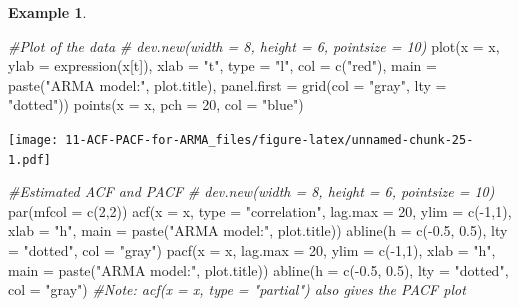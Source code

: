 \documentclass[
]{book}
\newenvironment{Shaded}{\begin{snugshade}}{\end{snugshade}}
\newcommand{\AttributeTok}[1]{\textcolor[rgb]{0.77,0.63,0.00}{#1}}
\newcommand{\CommentTok}[1]{\textcolor[rgb]{0.56,0.35,0.01}{\textit{#1}}}
\newcommand{\DecValTok}[1]{\textcolor[rgb]{0.00,0.00,0.81}{#1}}
\newcommand{\FloatTok}[1]{\textcolor[rgb]{0.00,0.00,0.81}{#1}}
\newcommand{\FunctionTok}[1]{\textcolor[rgb]{0.00,0.00,0.00}{#1}}
\newcommand{\NormalTok}[1]{#1}
\newcommand{\SpecialCharTok}[1]{\textcolor[rgb]{0.00,0.00,0.00}{#1}}
\newcommand{\StringTok}[1]{\textcolor[rgb]{0.31,0.60,0.02}{#1}}
\theoremstyle{definition}
\theoremstyle{definition}
\newtheorem{example}{Example}[chapter]
\theoremstyle{definition}
\theoremstyle{definition}
\theoremstyle{remark}
\begin{document}
\begin{example}
\begin{Shaded}
\begin{Highlighting}[]
  
  \CommentTok{\#Plot of the data}
  \CommentTok{\# dev.new(width = 8, height = 6, pointsize = 10)}
  \FunctionTok{plot}\NormalTok{(}\AttributeTok{x =}\NormalTok{ x, }\AttributeTok{ylab =} \FunctionTok{expression}\NormalTok{(x[t]), }\AttributeTok{xlab =} \StringTok{"t"}\NormalTok{, }\AttributeTok{type =} \StringTok{"l"}\NormalTok{, }\AttributeTok{col =} \FunctionTok{c}\NormalTok{(}\StringTok{"red"}\NormalTok{),  }
    \AttributeTok{main =}  \FunctionTok{paste}\NormalTok{(}\StringTok{"ARMA model:"}\NormalTok{, plot.title),}
    \AttributeTok{panel.first =} \FunctionTok{grid}\NormalTok{(}\AttributeTok{col =} \StringTok{"gray"}\NormalTok{, }\AttributeTok{lty =} \StringTok{"dotted"}\NormalTok{))}
  \FunctionTok{points}\NormalTok{(}\AttributeTok{x =}\NormalTok{ x, }\AttributeTok{pch =} \DecValTok{20}\NormalTok{, }\AttributeTok{col =} \StringTok{"blue"}\NormalTok{)}
\end{Highlighting}
\end{Shaded}

\texttt{[image: 11-ACF-PACF-for-ARMA\_files/figure-latex/unnamed-chunk-25-1.pdf]}

\begin{Shaded}
\begin{Highlighting}[]
  \CommentTok{\#Estimated ACF and PACF}
  \CommentTok{\# dev.new(width = 8, height = 6, pointsize = 10)}
  \FunctionTok{par}\NormalTok{(}\AttributeTok{mfcol =} \FunctionTok{c}\NormalTok{(}\DecValTok{2}\NormalTok{,}\DecValTok{2}\NormalTok{))}
  \FunctionTok{acf}\NormalTok{(}\AttributeTok{x =}\NormalTok{ x, }\AttributeTok{type =} \StringTok{"correlation"}\NormalTok{, }\AttributeTok{lag.max =} \DecValTok{20}\NormalTok{, }\AttributeTok{ylim =} \FunctionTok{c}\NormalTok{(}\SpecialCharTok{{-}}\DecValTok{1}\NormalTok{,}\DecValTok{1}\NormalTok{), }\AttributeTok{xlab =} \StringTok{"h"}\NormalTok{,}
    \AttributeTok{main =} \FunctionTok{paste}\NormalTok{(}\StringTok{"ARMA model:"}\NormalTok{, plot.title))}
  \FunctionTok{abline}\NormalTok{(}\AttributeTok{h =} \FunctionTok{c}\NormalTok{(}\SpecialCharTok{{-}}\FloatTok{0.5}\NormalTok{, }\FloatTok{0.5}\NormalTok{), }\AttributeTok{lty =} \StringTok{"dotted"}\NormalTok{, }\AttributeTok{col =} \StringTok{"gray"}\NormalTok{)}
  \FunctionTok{pacf}\NormalTok{(}\AttributeTok{x =}\NormalTok{ x, }\AttributeTok{lag.max =} \DecValTok{20}\NormalTok{, }\AttributeTok{ylim =} \FunctionTok{c}\NormalTok{(}\SpecialCharTok{{-}}\DecValTok{1}\NormalTok{,}\DecValTok{1}\NormalTok{), }\AttributeTok{xlab =} \StringTok{"h"}\NormalTok{,}
    \AttributeTok{main =} \FunctionTok{paste}\NormalTok{(}\StringTok{"ARMA model:"}\NormalTok{, plot.title))}
  \FunctionTok{abline}\NormalTok{(}\AttributeTok{h =} \FunctionTok{c}\NormalTok{(}\SpecialCharTok{{-}}\FloatTok{0.5}\NormalTok{, }\FloatTok{0.5}\NormalTok{), }\AttributeTok{lty =} \StringTok{"dotted"}\NormalTok{, }\AttributeTok{col =} \StringTok{"gray"}\NormalTok{)}
  \CommentTok{\#Note: acf(x = x, type = "partial") also gives the PACF plot}
  

\end{Highlighting}
\end{Shaded}
\end{example}
\end{document}
